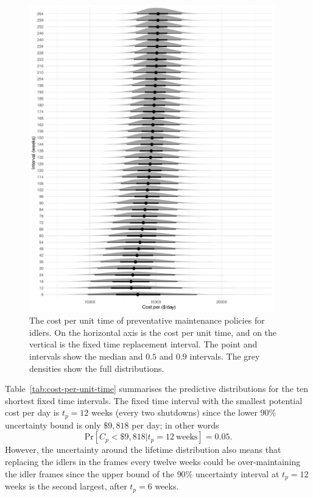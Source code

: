 \begin{figure}[tbp]
  \centering
  \includegraphics[width=0.95\textwidth]{./figures/ch-3/cost-funciton.pdf}
  \caption{The cost per unit time of preventative maintenance policies for idlers. On the horizontal axis is the cost per unit time, and on the vertical is the fixed time replacement interval. The point and intervals show the median and $0.5$ and $0.9$ intervals. The grey densities show the full distributions.}
  \label{fig:preventative-repl-decision}
\end{figure}

Table~\ref{tab:cost-per-unit-time} summarises the predictive distributions for the ten shortest fixed time intervals. 
The fixed time interval with the smallest potential cost per day is $t_p = 12$ weeks (every two shutdowns) since the lower $90\%$ uncertainty bound is only $\$9{,}818$ per day; in other words 
\begin{equation*}
 \text{Pr}\left[C_p < \$9{,}818 | t_p = 12 \: \text{weeks} \right] = 0.05.
\end{equation*}
However, the uncertainty around the lifetime distribution also means that replacing the idlers in the frames every twelve weeks could be over-maintaining the idler frames since the upper bound of the $90\%$ uncertainty interval at $t_p = 12$ weeks is the second largest, after $t_p = 6$ weeks.

